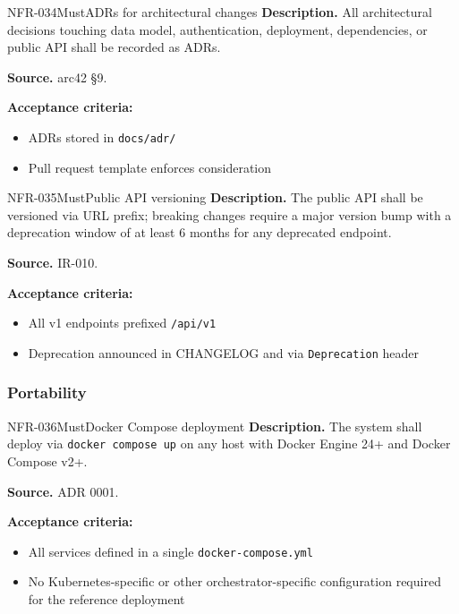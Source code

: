 \documentclass[11pt,a4paper]{article}
\begin{document}
\begin{requirement}{NFR-034}{Must}{ADRs for architectural changes}
\textbf{Description.} All architectural decisions touching data model, authentication, deployment, dependencies, or public API shall be recorded as ADRs.

\textbf{Source.} arc42 \S9.

\textbf{Acceptance criteria:}
\begin{itemize}
    \item ADRs stored in \texttt{docs/adr/}
    \item Pull request template enforces consideration
\end{itemize}
\end{requirement}

\begin{requirement}{NFR-035}{Must}{Public API versioning}
\textbf{Description.} The public API shall be versioned via URL prefix; breaking changes require a major version bump with a deprecation window of at least 6 months for any deprecated endpoint.

\textbf{Source.} IR-010.

\textbf{Acceptance criteria:}
\begin{itemize}
    \item All v1 endpoints prefixed \texttt{/api/v1}
    \item Deprecation announced in CHANGELOG and via \texttt{Deprecation} header
\end{itemize}
\end{requirement}

\subsubsection{Portability}

\begin{requirement}{NFR-036}{Must}{Docker Compose deployment}
\textbf{Description.} The system shall deploy via \texttt{docker compose up} on any host with Docker Engine 24+ and Docker Compose v2+.

\textbf{Source.} ADR 0001.

\textbf{Acceptance criteria:}
\begin{itemize}
    \item All services defined in a single \texttt{docker-compose.yml}
    \item No Kubernetes-specific or other orchestrator-specific configuration required for the reference deployment
\end{itemize}
\end{requirement}
\end{document}
